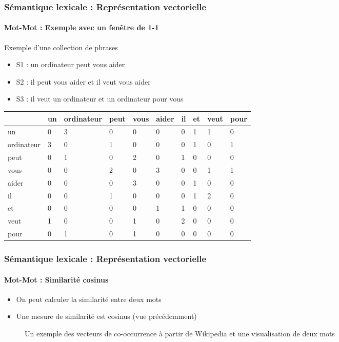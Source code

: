 \documentclass[xcolor=table]{beamer}
\begin{document}
\begin{frame}
\frametitle{Sémantique lexicale : Représentation vectorielle}
\framesubtitle{Mot-Mot : Exemple avec un fenêtre de 1-1}

\begin{exampleblock}{Exemple d'une collection de phrases}
	\begin{itemize}
		\item S1 : un ordinateur peut vous aider
		\item S2 : il peut vous aider et il veut vous aider
		\item S3 : il veut un ordinateur et un ordinateur pour vous
	\end{itemize}
\end{exampleblock}

\begin{center}
	\scriptsize
	\begin{tabular}{llllllllll}
		\hline\hline
		& un & ordinateur & peut & vous & aider & il & et & veut & pour \\
		\hline
		un & 0 & 3 & 0 & 0 & 0 & 0 & 1 & 1 & 0\\
		ordinateur & 3 & 0 & 1 & 0 & 0 & 0 & 1 & 0 & 1\\
		peut & 0 & 1 & 0 & 2 & 0 & 1 & 0 & 0 & 0\\
		vous & 0 & 0 & 2 & 0 & 3 & 0 & 0 & 1 & 1\\
		aider & 0 & 0 & 0 & 3 & 0 & 0 & 1 & 0 & 0\\
		il & 0 & 0 & 1 & 0 & 0 & 0 & 1 & 2 & 0\\
		et & 0 & 0 & 0 & 0 & 1 & 1 & 0 & 0 & 0\\
		veut & 1 & 0 & 0 & 1 & 0 & 2 & 0 & 0 & 0\\
		pour & 0 & 1 & 0 & 1 & 0 & 0 & 0 & 0 & 0\\
		\hline\hline
	\end{tabular}
\end{center}

\end{frame}

\begin{frame}
\frametitle{Sémantique lexicale : Représentation vectorielle}
\framesubtitle{Mot-Mot : Similarité cosinus}

\begin{itemize}
	\item On peut calculer la similarité entre deux mots
	\item Une mesure de similarité est cosinus (vue précédemment)
\end{itemize}


\begin{minipage}{.58\textwidth}
	\begin{figure}
		\caption{Un exemple des vecteurs de co-occurrence à partir de Wikipedia et une visualisation de deux mots \cite{2019-jurafsky-martin} }
	\end{figure}
\end{minipage}
\begin{minipage}{.4\textwidth}
\end{minipage}

\end{frame}
\end{document}
